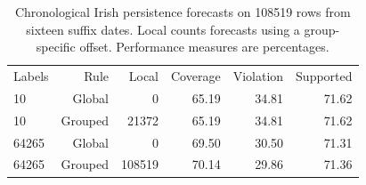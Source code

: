 \begin{table}[!ht]
\centering\small
\caption{Chronological Irish persistence forecasts on 108519 rows from sixteen suffix dates. Local counts forecasts using a group-specific offset. Performance measures are percentages.}
\begin{tabular}{lrrrrr}
\hline
Labels & Rule & Local & Coverage & Violation & Supported \\
10 & Global & 0 & 65.19 & 34.81 & 71.62 \\
10 & Grouped & 21372 & 65.19 & 34.81 & 71.62 \\
64265 & Global & 0 & 69.50 & 30.50 & 71.31 \\
64265 & Grouped & 108519 & 70.14 & 29.86 & 71.36 \\
\hline
\end{tabular}
\end{table}
